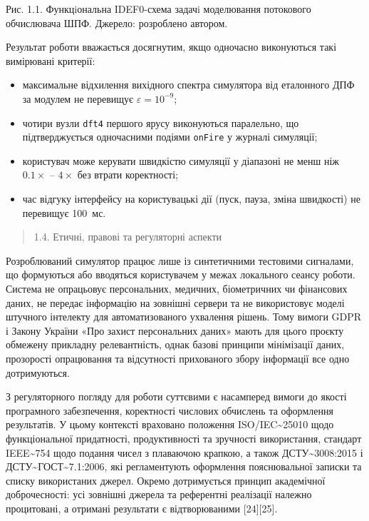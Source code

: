 \documentclass[
]{article}
\begin{document}
Рис. 1.1. Функцiональна IDEF0-схема задачi моделювання потокового
обчислювача ШПФ. Джерело: розроблено автором.

Результат роботи вважається досягнутим, якщо одночасно виконуються такі
вимірювані критерії:

\begin{itemize}
\item
  максимальне відхилення вихідного спектра симулятора від еталонного ДПФ
  за модулем не перевищує \(\varepsilon = 10^{- 9}\);
\item
  чотири вузли \texttt{dft4} першого ярусу виконуються паралельно, що
  підтверджується одночасними подіями \texttt{onFire} у журналі
  симуляції;
\item
  користувач може керувати швидкістю симуляції у діапазоні не менш ніж
  \(0.1 \times\) -- \(4 \times\) без втрати коректності;
\item
  час відгуку інтерфейсу на користувацькі дії (пуск, пауза, зміна
  швидкості) не перевищує 100~мс.
\end{itemize}

\begin{quote}
\protect{}\label{ux435ux442ux438ux447ux43dux456-ux43fux440ux430ux432ux43eux432ux456-ux442ux430-ux440ux435ux433ux443ux43bux44fux442ux43eux440ux43dux456-ux430ux441ux43fux435ux43aux442ux438}{}1.4.
Етичні, правові та регуляторні аспекти
\end{quote}

Розроблюваний симулятор працює лише із синтетичними тестовими сигналами,
що формуються або вводяться користувачем у межах локального сеансу
роботи. Система не опрацьовує персональних, медичних, біометричних чи
фінансових даних, не передає інформацію на зовнішні сервери та не
використовує моделі штучного інтелекту для автоматизованого ухвалення
рішень. Тому вимоги GDPR і Закону України «Про захист персональних
даних» мають для цього проєкту обмежену прикладну релевантність, однак
базові принципи мінімізації даних, прозорості опрацювання та відсутності
прихованого збору інформації все одно дотримуються.

З регуляторного погляду для роботи суттєвими є насамперед вимоги до
якості програмного забезпечення, коректності числових обчислень та
оформлення результатів. У цьому контексті враховано положення
ISO/IEC\textasciitilde25010 щодо функціональної придатності,
продуктивності та зручності використання, стандарт
IEEE\textasciitilde754 щодо подання чисел з плаваючою крапкою, а також
ДСТУ\textasciitilde3008:2015 і
ДСТУ\textasciitilde ГОСТ\textasciitilde7.1:2006, які регламентують
оформлення пояснювальної записки та списку використаних джерел. Окремо
дотримується принцип академічної доброчесності: усі зовнішні джерела та
референтні реалізації належно процитовані, а отримані результати є
відтворюваними {[}24{]}{[}25{]}.
\end{document}
